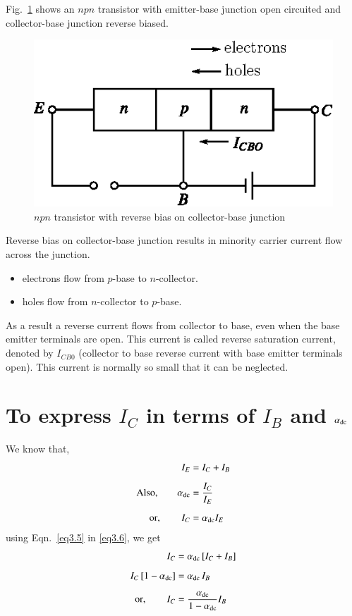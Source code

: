 Fig.~\ref{fig3.12} shows an $npn$ transistor with emitter-base junction open circuited and collector-base junction reverse biased.
\begin{figure}[H]
\centering
\includegraphics{chap2/fig2.12.eps}
\caption{$npn$ transistor with reverse bias on collector-base junction}\label{fig3.12}
\end{figure}

Reverse bias on collector-base junction results in minority carrier current flow across the junction.
\begin{itemize}
\item electrons flow from $p$-base to $n$-collector.

\item holes flow from $n$-collector to $p$-base.
\end{itemize}

As a result a reverse current flows from collector to base, even when the base emitter terminals are open. This current is called reverse saturation current, denoted by $I_{CB0}$ (collector to base reverse current with base emitter terminals open). This current is normally so small that it can be neglected. 

\section[To express $I_{C}$ in terms of $I_{B}$ and $\alpha_{\dc}$]{To express \boldmath$I_{C}$ in terms of $I_{B}$ and $\alpha_{\dc}$}\label{sec3.10}

We know that,
\begin{align}
I_{E} &=I_{C}+I_{B}\label{eq3.5}\\[5pt]
\text{Also,}\qquad \alpha_{\operatorname{dc}} &= \frac{I_{C}}{I_{E}}\notag\\[5pt]
\text{or},\qquad I_{C} &= \alpha_{\operatorname{dc}}I_{E}\label{eq3.6}
\end{align}
using Eqn.~\eqref{eq3.5} in \eqref{eq3.6}, we get
\begin{align}
I_{C} &= \alpha_{\operatorname{dc}}\,[I_{C}+I_{B}]\notag\\[5pt]
I_{C}\,[1-\alpha_{\operatorname{dc}}] &= \alpha_{\operatorname{dc}}\,I_{B}\notag\\[5pt]
\text{or},\qquad I_{C} &= \frac{\alpha_{\operatorname{dc}}}{1-\alpha_{\operatorname{dc}}}I_{B}\label{eq3.7}
\end{align}

